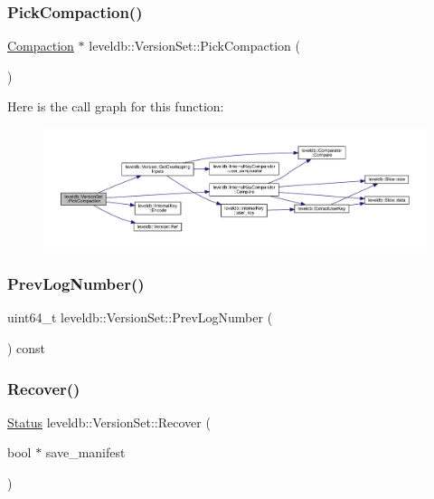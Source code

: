 \subsubsection{\texorpdfstring{PickCompaction()}{PickCompaction()}}
{\footnotesize\ttfamily \mbox{\hyperlink{classleveldb_1_1_compaction}{Compaction}} $\ast$ leveldb\+::\+Version\+Set\+::\+Pick\+Compaction (\begin{DoxyParamCaption}{ }\end{DoxyParamCaption})}

Here is the call graph for this function\+:
\nopagebreak
\begin{figure}[H]
\begin{center}
\leavevmode
\includegraphics[width=350pt]{classleveldb_1_1_version_set_a1cdc6a05e0a7df9f29b5bccd485a0219_cgraph}
\end{center}
\end{figure}
\mbox{\label{classleveldb_1_1_version_set_aa0130ef9785e68ccc85506a79cb433be}} 
\subsubsection{\texorpdfstring{PrevLogNumber()}{PrevLogNumber()}}
{\footnotesize\ttfamily uint64\+\_\+t leveldb\+::\+Version\+Set\+::\+Prev\+Log\+Number (\begin{DoxyParamCaption}{ }\end{DoxyParamCaption}) const\hspace{0.3cm}{\ttfamily [inline]}}

\mbox{\label{classleveldb_1_1_version_set_a456517154663338d106225cbbc254551}} 
\subsubsection{\texorpdfstring{Recover()}{Recover()}}
{\footnotesize\ttfamily \mbox{\hyperlink{classleveldb_1_1_status}{Status}} leveldb\+::\+Version\+Set\+::\+Recover (\begin{DoxyParamCaption}\item[{bool $\ast$}]{save\+\_\+manifest }\end{DoxyParamCaption})}

